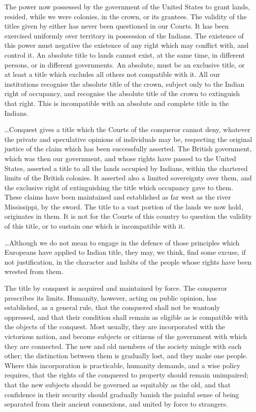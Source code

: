 The power now possessed by the government of the United States to grant lands,
resided, while we were colonies, in the crown, or its grantees. The validity of
the titles given by either has never been questioned in our Courts. It has been
exercised uniformly over territory in possession of the Indians. The existence
of this power must negative the existence of any right which may conflict with,
and control it. An absolute title to lands cannot exist, at the same time, in
different persons, or in different governments. An absolute, must be an
exclusive title, or at least a title which excludes all others not compatible
with it. All our institutions recognise the absolute title of the crown, subject
only to the Indian right of occupancy, and recognise the absolute title of the
crown to extinguish that right. This is incompatible with an absolute and
complete title in the Indians.

\ldots Conquest gives a title which the Courts of the conqueror cannot deny,
whatever the private and speculative opinions of individuals may be, respecting
the original justice of the claim which has been successfully asserted. The
British government, which was then our government, and whose rights have passed
to the United States, asserted a title to all the lands occupied by Indians,
within the chartered limits of the British colonies. It asserted also a limited
sovereignty over them, and the exclusive right of extinguishing the title which
occupancy gave to them. These claims have been maintained and established as far
west as the river Mississippi, by the sword. The title to a vast portion of the
lands we now hold, originates in them. It is not for the Courts of this country
to question the validity of this title, or to sustain one which is incompatible
with it.

\ldots Although we do not mean to engage in the defence of those principles
which Europeans have applied to Indian title, they may, we think, find some
excuse, if not justification, in the character and habits of the people whose
rights have been wrested from them.

The title by conquest is acquired and maintained by force. The conqueror
prescribes its limits. Humanity, however, acting on public opinion, has
established, as a general rule, that the conquered shall not be wantonly
oppressed, and that their condition shall remain as eligible as is compatible
with the objects of the conquest. Most usually, they are incorporated with the
victorious nation, and become subjects or citizens of the government with which
they are connected. The new and old members of the society mingle with each
other; the distinction between them is gradually lost, and they make one people.
Where this incorporation is practicable, humanity demands, and a wise policy
requires, that the rights of the conquered to property should remain unimpaired;
that the new subjects should be governed as equitably as the old, and that
confidence in their security should gradually banish the painful sense of being
separated from their ancient connexions, and united by force to strangers.

